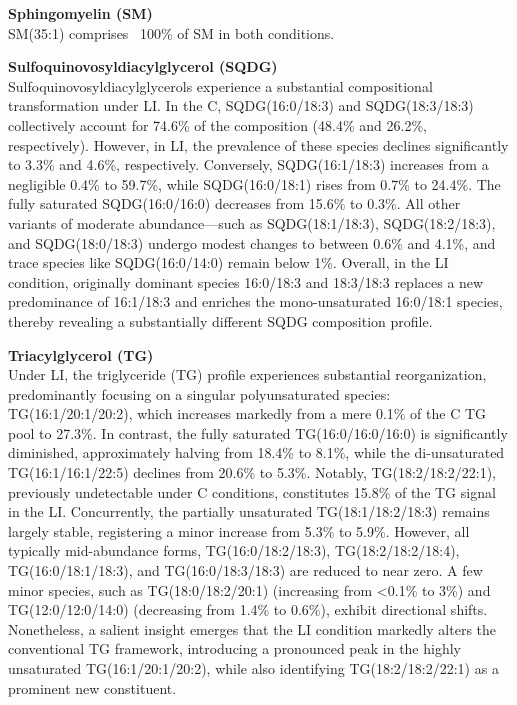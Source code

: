 \documentclass[10pt,letterpaper]{article}
\begin{document}
\textbf{Sphingomyelin (SM)}  \\
SM(35:1) comprises ~100\% of SM in both conditions.

\textbf{Sulfoquinovosyldiacylglycerol (SQDG)}  \\
Sulfoquinovosyldiacylglycerols experience a substantial compositional transformation under LI. In the C, SQDG(16:0/18:3) and SQDG(18:3/18:3) collectively account for 74.6\% of the composition (48.4\% and 26.2\%, respectively). However, in LI, the prevalence of these species declines significantly to 3.3\% and 4.6\%, respectively. Conversely, SQDG(16:1/18:3) increases from a negligible 0.4\% to 59.7\%, while SQDG(16:0/18:1) rises from 0.7\% to 24.4\%. The fully saturated SQDG(16:0/16:0) decreases from 15.6\% to 0.3\%. All other variants of moderate abundance—such as SQDG(18:1/18:3), SQDG(18:2/18:3), and SQDG(18:0/18:3) undergo modest changes to between 0.6\% and 4.1\%, and trace species like SQDG(16:0/14:0) remain below 1\%. Overall, in the LI condition, originally dominant species 16:0/18:3 and 18:3/18:3 replaces a new predominance of 16:1/18:3 and enriches the mono-unsaturated 16:0/18:1 species, thereby revealing a substantially different SQDG composition profile.

\textbf{Triacylglycerol (TG)}  \\
Under LI, the triglyceride (TG) profile experiences substantial reorganization, predominantly focusing on a singular polyunsaturated species: TG(16:1/20:1/20:2), which increases markedly from a mere 0.1\% of the C TG pool to 27.3\%. In contrast, the fully saturated TG(16:0/16:0/16:0) is significantly diminished, approximately halving from 18.4\% to 8.1\%, while the di-unsaturated TG(16:1/16:1/22:5) declines from 20.6\% to 5.3\%. Notably, TG(18:2/18:2/22:1), previously undetectable under C conditions, constitutes 15.8\% of the TG signal in the LI. Concurrently, the partially unsaturated TG(18:1/18:2/18:3) remains largely stable, registering a minor increase from 5.3\% to 5.9\%. However, all typically mid-abundance forms, TG(16:0/18:2/18:3), TG(18:2/18:2/18:4), TG(16:0/18:1/18:3), and TG(16:0/18:3/18:3) are reduced to near zero. A few minor species, such as TG(18:0/18:2/20:1) (increasing from \textless0.1\% to 3\%) and TG(12:0/12:0/14:0) (decreasing from 1.4\% to 0.6\%), exhibit directional shifts. Nonetheless, a salient insight emerges that the LI condition markedly alters the conventional TG framework, introducing a pronounced peak in the highly unsaturated TG(16:1/20:1/20:2), while also identifying TG(18:2/18:2/22:1) as a prominent new constituent.
\bigskip
\end{document}
